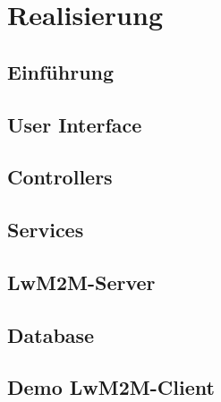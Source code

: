 \chapter{Realisierung}
\section{Einführung}





\section{User Interface}





\section{Controllers}





\section{Services}





\section{LwM2M-Server}





\section{Database}





\section{Demo LwM2M-Client}
